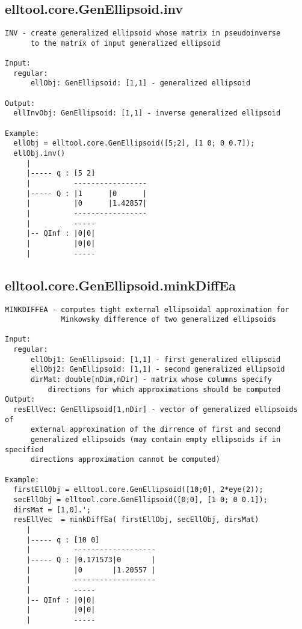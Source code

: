 \subsection{\texorpdfstring{elltool.core.GenEllipsoid.inv}{inv}}\label{method:elltool.core.GenEllipsoid.inv}
\begin{verbatim}
INV - create generalized ellipsoid whose matrix in pseudoinverse
      to the matrix of input generalized ellipsoid

Input:
  regular:
      ellObj: GenEllipsoid: [1,1] - generalized ellipsoid

Output:
  ellInvObj: GenEllipsoid: [1,1] - inverse generalized ellipsoid

Example:
  ellObj = elltool.core.GenEllipsoid([5;2], [1 0; 0 0.7]);
  ellObj.inv()
     |
     |----- q : [5 2]
     |          -----------------
     |----- Q : |1      |0      |
     |          |0      |1.42857|
     |          -----------------
     |          -----
     |-- QInf : |0|0|
     |          |0|0|
     |          -----
\end{verbatim}
\subsection{\texorpdfstring{elltool.core.GenEllipsoid.minkDiffEa}{minkDiffEa}}\label{method:elltool.core.GenEllipsoid.minkDiffEa}
\begin{verbatim}
MINKDIFFEA - computes tight external ellipsoidal approximation for
             Minkowsky difference of two generalized ellipsoids

Input:
  regular:
      ellObj1: GenEllipsoid: [1,1] - first generalized ellipsoid
      ellObj2: GenEllipsoid: [1,1] - second generalized ellipsoid
      dirMat: double[nDim,nDir] - matrix whose columns specify
          directions for which approximations should be computed
Output:
  resEllVec: GenEllipsoid[1,nDir] - vector of generalized ellipsoids of
      external approximation of the dirrence of first and second
      generalized ellipsoids (may contain empty ellipsoids if in specified
      directions approximation cannot be computed)

Example:
  firstEllObj = elltool.core.GenEllipsoid([10;0], 2*eye(2));
  secEllObj = elltool.core.GenEllipsoid([0;0], [1 0; 0 0.1]);
  dirsMat = [1,0].';
  resEllVec  = minkDiffEa( firstEllObj, secEllObj, dirsMat)
     |
     |----- q : [10 0]
     |          -------------------
     |----- Q : |0.171573|0       |
     |          |0       |1.20557 |
     |          -------------------
     |          -----
     |-- QInf : |0|0|
     |          |0|0|
     |          -----
\end{verbatim}
